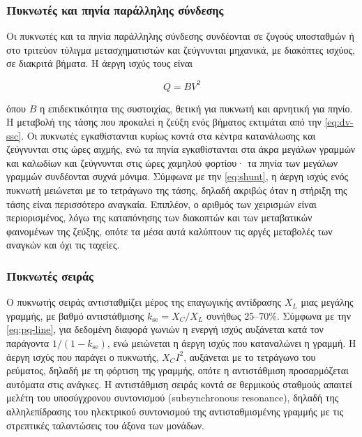 \subsubsection{Πυκνωτές και πηνία παράλληλης σύνδεσης}

Οι πυκνωτές και τα πηνία παράλληλης σύνδεσης συνδέονται σε ζυγούς υποσταθμών ή στο τριτεύον
τύλιγμα μετασχηματιστών και ζεύγνυνται μηχανικά, με διακόπτες ισχύος, σε διακριτά βήματα. Η
άεργη ισχύς τους είναι

\begin{equation}
Q = B V^2
\label{eq:shunt}
\end{equation}

όπου $B$ η επιδεκτικότητα της συστοιχίας, θετική για πυκνωτή και αρνητική για πηνίο. Η
μεταβολή της τάσης που προκαλεί η ζεύξη ενός βήματος εκτιμάται από την \eqref{eq:dv-ssc}. Οι
πυκνωτές εγκαθίστανται κυρίως κοντά στα κέντρα κατανάλωσης και ζεύγνυνται στις ώρες αιχμής,
ενώ τα πηνία εγκαθίστανται στα άκρα μεγάλων γραμμών και καλωδίων και ζεύγνυνται στις ώρες
χαμηλού φορτίου· τα πηνία των μεγάλων γραμμών συνδέονται συχνά μόνιμα. Σύμφωνα με την
\eqref{eq:shunt}, η άεργη ισχύς ενός πυκνωτή μειώνεται με το τετράγωνο της τάσης, δηλαδή
ακριβώς όταν η στήριξη της τάσης είναι περισσότερο αναγκαία. Επιπλέον, ο αριθμός των χειρισμών
είναι περιορισμένος, λόγω της καταπόνησης των διακοπτών και των μεταβατικών φαινομένων της
ζεύξης, οπότε τα μέσα αυτά καλύπτουν τις αργές μεταβολές των αναγκών και όχι τις ταχείες.

\subsubsection{Πυκνωτές σειράς}

Ο πυκνωτής σειράς αντισταθμίζει μέρος της επαγωγικής αντίδρασης $X_L$ μιας μεγάλης γραμμής,
με βαθμό αντιστάθμισης $k_{\mathrm{se}} = X_C / X_L$ συνήθως 25--70\%. Σύμφωνα με την
\eqref{eq:pq-line}, για δεδομένη διαφορά γωνιών η ενεργή ισχύς αυξάνεται κατά τον παράγοντα
$1/(1 - k_{\mathrm{se}})$, ενώ μειώνεται η άεργη ισχύς που καταναλώνει η γραμμή. Η άεργη
ισχύς που παράγει ο πυκνωτής, $X_C I^2$, αυξάνεται με το τετράγωνο του ρεύματος, δηλαδή με τη
φόρτιση της γραμμής, οπότε η αντιστάθμιση προσαρμόζεται αυτόματα στις ανάγκες. Η αντιστάθμιση
σειράς κοντά σε θερμικούς σταθμούς απαιτεί μελέτη του υποσύγχρονου συντονισμού
(subsynchronous resonance), δηλαδή της αλληλεπίδρασης του ηλεκτρικού συντονισμού της
αντισταθμισμένης γραμμής με τις στρεπτικές ταλαντώσεις του άξονα των μονάδων.

